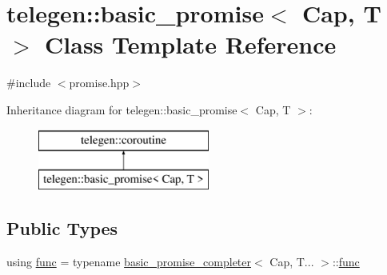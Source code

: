\hypertarget{classtelegen_1_1basic__promise}{}\section{telegen\+:\+:basic\+\_\+promise$<$ Cap, T $>$ Class Template Reference}
\label{classtelegen_1_1basic__promise}


{\ttfamily \#include $<$promise.\+hpp$>$}

Inheritance diagram for telegen\+:\+:basic\+\_\+promise$<$ Cap, T $>$\+:\begin{figure}[H]
\begin{center}
\leavevmode
\includegraphics[height=2.000000cm]{classtelegen_1_1basic__promise}
\end{center}
\end{figure}
\subsection*{Public Types}
\begin{DoxyCompactItemize}
\item 
using \hyperlink{classtelegen_1_1basic__promise_a41bba6927e718eed58a7e6e91db6f6d3}{func} = typename \hyperlink{classtelegen_1_1basic__promise__completer}{basic\+\_\+promise\+\_\+completer}$<$ Cap, T... $>$\+::\hyperlink{classtelegen_1_1basic__promise_a41bba6927e718eed58a7e6e91db6f6d3}{func}
\end{DoxyCompactItemize}
